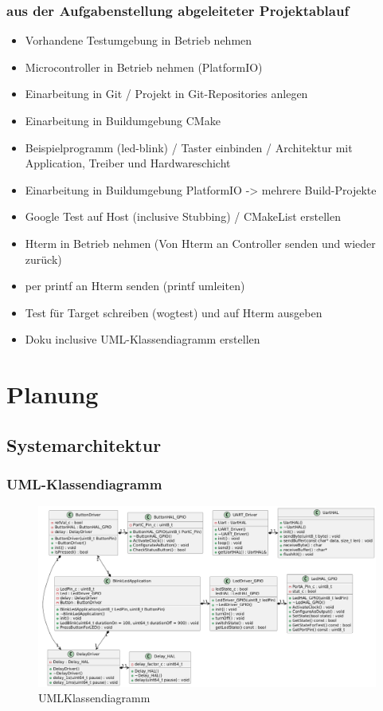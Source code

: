 \documentclass[12pt,a4paper]{article}
\begin{document}
\newpage
\subsubsection{aus der Aufgabenstellung abgeleiteter Projektablauf}
\begin{itemize}
  \item Vorhandene Testumgebung in Betrieb nehmen
  \item Microcontroller in Betrieb nehmen (PlatformIO)
  \item Einarbeitung in Git / Projekt in Git-Repositories anlegen
  \item Einarbeitung in Buildumgebung CMake
  \item Beispielprogramm (led-blink) / Taster einbinden / Architektur mit Application, Treiber und Hardwareschicht
  \item Einarbeitung in Buildumgebung PlatformIO -> mehrere Build-Projekte
  \item Google Test auf Host (inclusive Stubbing) / CMakeList erstellen
  \item Hterm in Betrieb nehmen (Von Hterm an Controller senden und wieder zurück)
  \item per printf an Hterm senden (printf umleiten)
  \item Test für Target schreiben (wogtest) und auf Hterm ausgeben
  \item Doku inclusive UML-Klassendiagramm erstellen
\end{itemize}



\newpage

\section{Planung}
\subsection{Systemarchitektur}
\subsubsection{UML-Klassendiagramm}
\begin{figure}[htbp]
  \centering
  \includegraphics[width=\textwidth]{LED_Blink_UML.png}
  \caption{UMLKlassendiagramm}
  \label{fig:uml_led_blink}
\end{figure}
\end{document}
